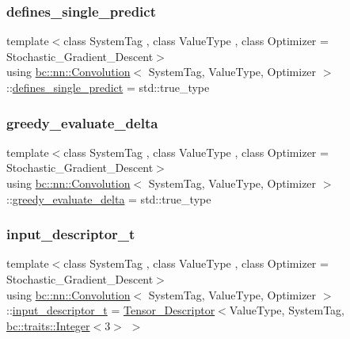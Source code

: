 \subsubsection{\texorpdfstring{defines\+\_\+single\+\_\+predict}{defines\_single\_predict}}
{\footnotesize\ttfamily template$<$class System\+Tag , class Value\+Type , class Optimizer  = Stochastic\+\_\+\+Gradient\+\_\+\+Descent$>$ \\
using \hyperlink{structbc_1_1nn_1_1Convolution}{bc\+::nn\+::\+Convolution}$<$ System\+Tag, Value\+Type, Optimizer $>$\+::\hyperlink{structbc_1_1nn_1_1Convolution_a10d2913efe2df593fd0491fc1cc39dc6}{defines\+\_\+single\+\_\+predict} =  std\+::true\+\_\+type}

\mbox{\label{structbc_1_1nn_1_1Convolution_a5e9292df10095f5c69ef52837f523290}} 
\subsubsection{\texorpdfstring{greedy\+\_\+evaluate\+\_\+delta}{greedy\_evaluate\_delta}}
{\footnotesize\ttfamily template$<$class System\+Tag , class Value\+Type , class Optimizer  = Stochastic\+\_\+\+Gradient\+\_\+\+Descent$>$ \\
using \hyperlink{structbc_1_1nn_1_1Convolution}{bc\+::nn\+::\+Convolution}$<$ System\+Tag, Value\+Type, Optimizer $>$\+::\hyperlink{structbc_1_1nn_1_1Convolution_a5e9292df10095f5c69ef52837f523290}{greedy\+\_\+evaluate\+\_\+delta} =  std\+::true\+\_\+type}

\mbox{\label{structbc_1_1nn_1_1Convolution_a01dcd0bf8ae2c1d94118a4f410b3e568}} 
\subsubsection{\texorpdfstring{input\+\_\+descriptor\+\_\+t}{input\_descriptor\_t}}
{\footnotesize\ttfamily template$<$class System\+Tag , class Value\+Type , class Optimizer  = Stochastic\+\_\+\+Gradient\+\_\+\+Descent$>$ \\
using \hyperlink{structbc_1_1nn_1_1Convolution}{bc\+::nn\+::\+Convolution}$<$ System\+Tag, Value\+Type, Optimizer $>$\+::\hyperlink{structbc_1_1nn_1_1Convolution_a01dcd0bf8ae2c1d94118a4f410b3e568}{input\+\_\+descriptor\+\_\+t} =  \hyperlink{structbc_1_1nn_1_1Tensor__Descriptor}{Tensor\+\_\+\+Descriptor}$<$Value\+Type, System\+Tag, \hyperlink{structbc_1_1traits_1_1Integer}{bc\+::traits\+::\+Integer}$<$3$>$ $>$}


